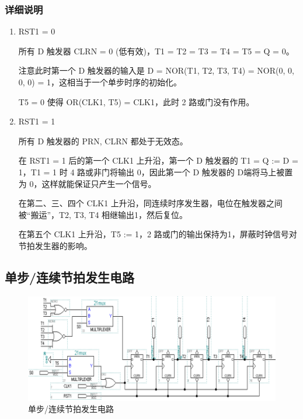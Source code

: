 \subsubsection{详细说明}

\begin{enumerate}
    \item RST1 = 0
    
    所有 D 触发器 CLRN = 0 (低有效)，T1 = T2 = T3 = T4 = T5 = Q = 0。
    
    注意此时第一个 D 触发器的输入是 D = NOR(T1, T2, T3, T4) = NOR(0, 0, 0, 0) = 1，这相当于一个单步时序的初始化。
    
    T5 = 0 使得 OR(CLK1, T5) = CLK1，此时 2 路或门没有作用。
    
    \item RST1 = 1
    
    所有 D 触发器的 PRN, CLRN 都处于无效态。
    
    在 RST1 = 1 后的第一个 CLK1 上升沿，第一个 D 触发器的 T1 = Q := D = 1，T1 = 1 时 4 路或非门将输出 0，因此第一个 D 触发器的 D端将马上被置为 0，这样就能保证只产生一个信号。
    
    在第二、三、四个 CLK1 上升沿，同连续时序发生器，电位在触发器之间被“搬运”，T2, T3, T4 相继输出1，然后复位。
    
    在第五个 CLK1 上升沿，T5 := 1，2 路或门的输出保持为1，屏蔽时钟信号对节拍发生器的影响。
        
\end{enumerate}

\subsection{单步/连续节拍发生电路}


\begin{figure}[h]
\centering
\includegraphics[width=\textwidth]{images/prin1_3.png}
\caption{单步/连续节拍发生电路}
\label{fig:prin1_3}
\end{figure}

